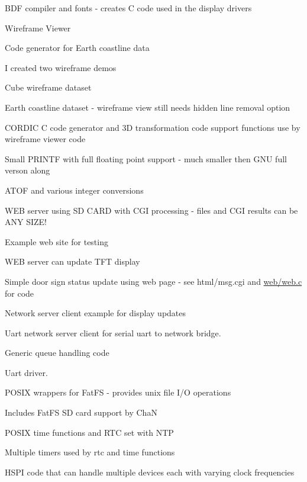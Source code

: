 \begin{DoxyItemize}
\item B\+DF compiler and fonts -\/ creates C code used in the display drivers
\item Wireframe Viewer
\begin{DoxyItemize}
\item Code generator for Earth coastline data
\item I created two wireframe demos
\begin{DoxyItemize}
\item Cube wireframe dataset
\item Earth coastline dataset -\/ wireframe view still needs hidden line removal option
\end{DoxyItemize}
\end{DoxyItemize}
\item C\+O\+R\+D\+IC C code generator and 3D transformation code support functions use by wireframe viewer code
\item Small P\+R\+I\+N\+TF with full floating point support -\/ much smaller then G\+NU full verson along
\item A\+T\+OF and various integer conversions
\item W\+EB server using SD C\+A\+RD with C\+GI processing -\/ files and C\+GI results can be A\+NY S\+I\+Z\+E!
\begin{DoxyItemize}
\item Example web site for testing
\item W\+EB server can update T\+FT display
\begin{DoxyItemize}
\item Simple door sign status update using web page -\/ see html/msg.\+cgi and \hyperlink{web_8c}{web/web.\+c} for code
\end{DoxyItemize}
\end{DoxyItemize}
\item Network server client example for display updates
\item Uart network server client for serial uart to network bridge.
\item Generic queue handling code
\item Uart driver.
\item P\+O\+S\+IX wrappers for Fat\+FS -\/ provides unix file I/O operations
\begin{DoxyItemize}
\item Includes Fat\+FS SD card support by ChaN
\end{DoxyItemize}
\item P\+O\+S\+IX time functions and R\+TC set with N\+TP
\item Multiple timers used by rtc and time functions
\item H\+S\+PI code that can handle multiple devices each with varying clock frequencies
\end{DoxyItemize}

